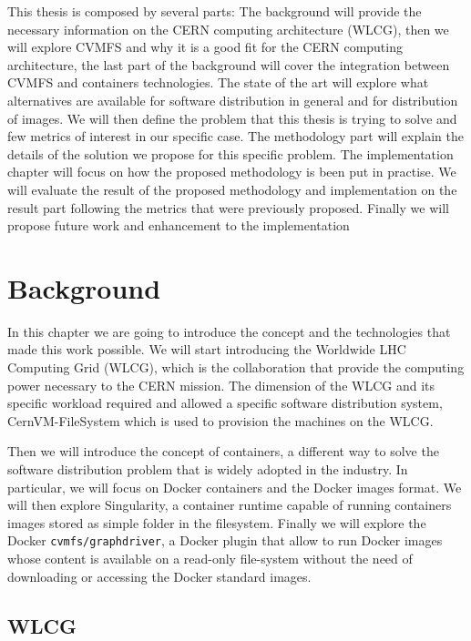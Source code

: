 This thesis is composed by several parts: The background will provide the
necessary information on the CERN computing architecture (WLCG), then we will
explore CVMFS and why it is a good fit for the CERN computing architecture, the
last part of the background will cover the integration between CVMFS and
containers technologies.  The state of the art will explore what alternatives
are available for software distribution in general and for distribution of
images.  We will then define the problem that this thesis is trying to solve
and few metrics of interest in our specific case.  The methodology part will
explain the details of the solution we propose for this specific problem.  The
implementation chapter will focus on how the proposed methodology is been put
in practise.  We will evaluate the result of the proposed methodology and
implementation on the result part following the metrics that were previously
proposed.  Finally we will propose future work and enhancement to the
implementation

\chapter{Background}\label{ch:background}

In this chapter we are going to introduce the concept and the technologies that
made this work possible.  We will start introducing the Worldwide LHC Computing
Grid (WLCG), which is the collaboration that provide the computing power
necessary to the CERN mission. The dimension of the WLCG and its specific
workload required and allowed a specific software distribution system,
CernVM-FileSystem which is used to provision the machines on the WLCG.

Then we will introduce the concept of containers, a different way to solve the
software distribution problem that is widely adopted in the industry. In
particular, we will focus on Docker containers and the Docker images format. We
will then explore Singularity, a container runtime capable of running
containers images stored as simple folder in the filesystem. Finally we will
explore the Docker \texttt{cvmfs/graphdriver}, a Docker plugin that allow to
run Docker images whose content is available on a read-only file-system without
the need of downloading or accessing the Docker standard images.


\section{WLCG}

